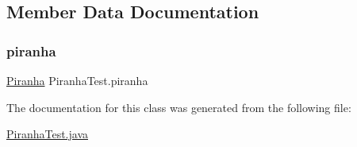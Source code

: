 \subsection{Member Data Documentation}
\mbox{\label{class_piranha_test_a77b3ec64ac02dc0762b1106fe4ccd4aa}} 
\subsubsection{\texorpdfstring{piranha}{piranha}}
{\footnotesize\ttfamily \mbox{\hyperlink{class_piranha}{Piranha}} Piranha\+Test.\+piranha}



The documentation for this class was generated from the following file\+:\begin{DoxyCompactItemize}
\item 
\mbox{\hyperlink{_piranha_test_8java}{Piranha\+Test.\+java}}\end{DoxyCompactItemize}
